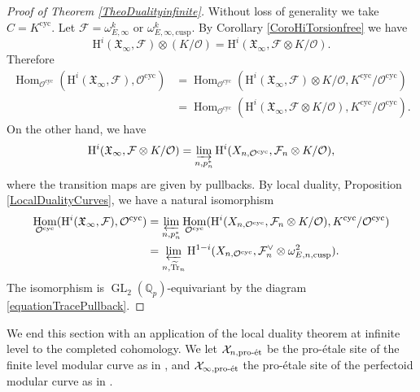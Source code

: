 \documentclass[JEP,XML,SOM,Unicode,published]{cedram}
\newcommand{\cusp}{\mathrm{cusp}}
\newcommand{\cyc}{\mathrm{cyc}}
\newcommand{\et}{\mathrm{\acute{e}t}}
\newcommand{\proet}{\mathrm{pro}\textup{-}\et}
\numberwithin{equation}{section}
\theoremstyle{definition}
\newcommand{\bb}[1]{\mathbb{#1}}
\newcommand{\n}[1]{\mathcal{#1}}
\newcommand{\f}[1]{\mathfrak{#1}}
\DeclareMathOperator{\GL}{GL}
\DeclareMathOperator{\Tr}{Tr}
\DeclareMathOperator{\Hom}{Hom}
\begin{document}
\begin{proof}[Proof of Theorem \ref{TheoDualityinfinite}]

Without loss of generality we take $C\!=\!K^{\cyc}$. Let $\n{F}\!=\!\omega_{E,\infty}^k$ or $\omega^{k}_{E,\infty, \cusp}$. By Corollary \ref{CoroHiTorsionfree} we have
\[
\mathrm{H}^i(\f{X}_{\infty}, \n{F})\otimes (K/ \n{O}) = \mathrm{H}^i(\f{X}_{\infty}, \n{F} \otimes K/ \n{O}).
\]
Therefore
\begin{align*}
\Hom_{\n{O}^{\cyc}}(\mathrm{H}^i(\f{X}_{\infty}, \n{F}), \n{O}^{\cyc}) & = \Hom_{\n{O}^{\cyc}}(\mathrm{H}^i(\f{X}_{\infty}, \n{F})\otimes K/ \n{O} , K^{\cyc}/\n{O}^{\cyc}) \\
							 & = \Hom_{\n{O}^{\cyc}}(\mathrm{H}^i(\f{X}_{\infty}, \n{F}\otimes K/ \n{O}) , K^{\cyc}/\n{O}^{\cyc}).
\end{align*}
On the other hand, we have
\[
\mathrm{H}^i(\f{X}_{\infty}, \n{F}\otimes K/ \n{O}) = \varinjlim_{n,p_n^*} \mathrm{H}^i(X_{n,\n{O}^{\cyc}}, \n{F}_n\otimes K/ \n{O}),
\]
where the transition maps are given by pullbacks. By local duality, Proposition \ref{LocalDualityCurves}, we have a natural isomorphism
\begin{align*}
\Hom_{\n{O}^{\cyc}}(\mathrm{H}^i(\f{X}_{\infty}, \n{F}), \n{O}^{\cyc}) & = \varprojlim_{n, p_n^*} \Hom_{\n{O}^{\cyc}}(\mathrm{H}^i(X_{n,\n{O}^{\cyc}}, \n{F}_n \otimes K/ \n{O}), K^{\cyc}/ \n{O}^{\cyc}) \\
					& = \varprojlim_{n, \widetilde{\Tr}_n} \mathrm{H}^{1-i}(X_{n,\n{O}^{\cyc}}, \n{F}_n^{\vee}\otimes \omega^2_{E,n,\cusp}).
\end{align*}
The isomorphism is $\GL_2(\bb{Q}_p)$-equivariant by the diagram \eqref{equationTracePullback}.
\end{proof}

We end this section with an application of the local duality theorem at infinite level to the completed cohomology. We let $\n{X}_{n,\proet}$ be the pro-étale site of the finite level modular curve as in \cite[\S 3]{MR3090230}, and $\n{X}_{\infty, \proet}$ the pro-étale site of the perfectoid modular curve as in \cite[Lect.\,8]{ScholzeWeinspadicgeometry}.
\end{document}
